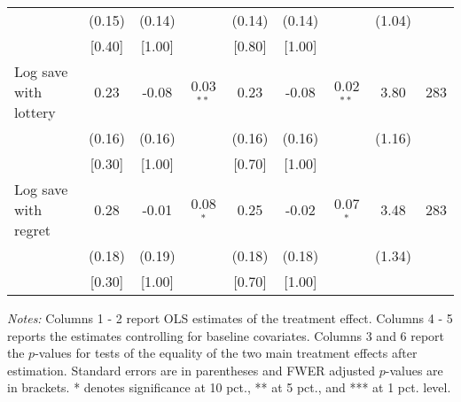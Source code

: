 \begin{table}[htbp]
{\begin{threeparttable}
\begin{tabular}{l*{8}{c}}
          &   (0.15)&   (0.14)&         &   (0.14)&   (0.14)&         &   (1.04)&         \\
          &   [0.40]&   [1.00]&         &   [0.80]&   [1.00]&         &         &         \\
Log save with lottery&     0.23&    -0.08&0.03$^{**}$&     0.23&    -0.08&0.02$^{**}$&     3.80&      283\\
          &   (0.16)&   (0.16)&         &   (0.16)&   (0.16)&         &   (1.16)&         \\
          &   [0.30]&   [1.00]&         &   [0.70]&   [1.00]&         &         &         \\
Log save with regret&     0.28&    -0.01&0.08$^{*}$&     0.25&    -0.02&0.07$^{*}$&     3.48&      283\\
          &   (0.18)&   (0.19)&         &   (0.18)&   (0.18)&         &   (1.34)&         \\
          &   [0.30]&   [1.00]&         &   [0.70]&   [1.00]&         &         &         \\
\bottomrule \end{tabular} \begin{tablenotes}[flushleft] \footnotesize \item \emph{Notes:} Columns 1 - 2 report OLS estimates of the treatment effect. Columns 4 - 5 reports the estimates controlling for baseline covariates. Columns 3 and 6 report the \(p\)-values for tests of the equality of the two main treatment effects after estimation. Standard errors are in parentheses and FWER adjusted \(p\)-values are in brackets. * denotes significance at 10 pct., ** at 5 pct., and *** at 1 pct. level. \end{tablenotes} \end{threeparttable} } \end{table}

